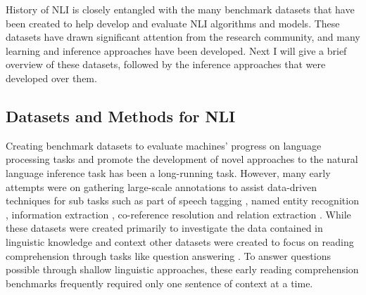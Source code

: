  History of NLI is closely entangled with the many benchmark datasets that have been created to help develop and evaluate NLI algorithms and models. These datasets have drawn significant attention from the research community, and many learning
and inference approaches have been developed. Next I will give a brief overview of these datasets, followed by the inference approaches that were developed over them. 

\subsection{Datasets and Methods for NLI}


Creating benchmark datasets to evaluate machines' progress on language processing tasks and promote the development of novel approaches to the natural language inference task has been a long-running task. However, many early attempts were on gathering large-scale annotations to assist data-driven techniques for sub tasks such as part of speech tagging \citep{marcus1993building},
named entity recognition \citep{grishman1996message}, information extraction \citep{sundheim1993tipster}, co-reference resolution and relation extraction \citep{doddington2004automatic}. While these datasets were created primarily to investigate the data contained in linguistic knowledge and context other datasets were created to focus on reading comprehension through tasks like question answering \citep{hirschman1999deep}. To answer questions possible through shallow linguistic approaches, these early reading comprehension benchmarks frequently required only one sentence of context at a time.

